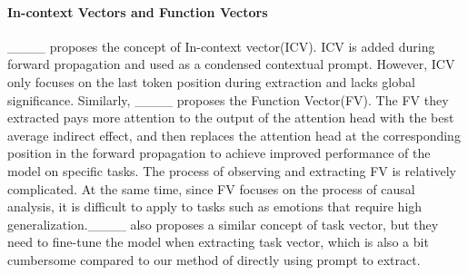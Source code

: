 \paragraph{In-context Vectors and Function Vectors} ____ proposes the concept of In-context vector(ICV). ICV is added during forward propagation and used as a condensed contextual prompt. 
However, ICV only focuses on the last token position during extraction and lacks global significance. 
Similarly, ____ proposes the Function Vector(FV). The FV they extracted pays more attention to the output of the attention head with the best average indirect effect, and then replaces the attention head at the corresponding position in the forward propagation to achieve improved performance of the model on specific tasks. The process of observing and extracting FV is relatively complicated. At the same time, since FV focuses on the process of causal analysis, it is difficult to apply to tasks such as emotions that require high generalization.____ also proposes a similar concept of task vector, but they need to fine-tune the model when extracting task vector, which is also a bit cumbersome compared to our method of directly using prompt to extract.

